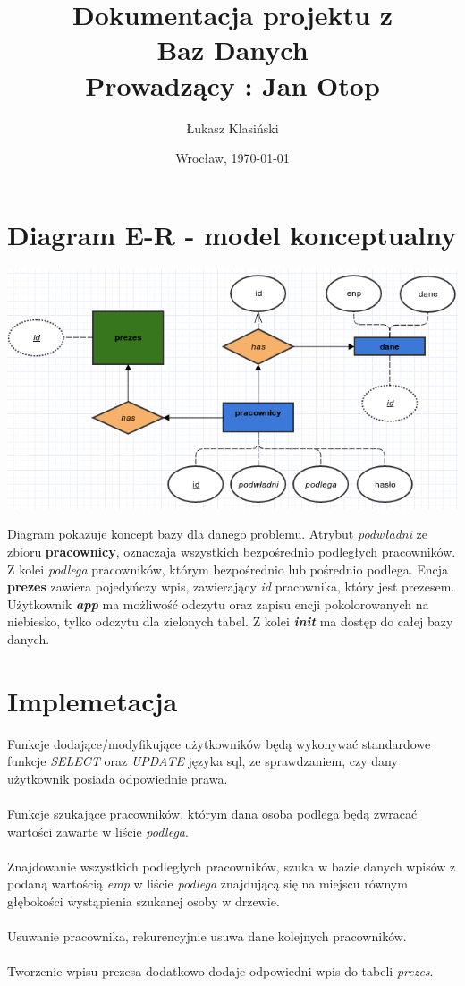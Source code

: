 \documentclass[11pt, wide]{article}
\author{Łukasz Klasiński}
\date{Wrocław, \today}
\title{\LARGE\textbf{Dokumentacja projektu z \\Baz Danych\\}
    Prowadzący : Jan Otop}
\begin{document}
    \maketitle
    \thispagestyle{empty}
    \section{Diagram E-R - model konceptualny}
    \includegraphics[width=\textwidth]{er}    

    Diagram pokazuje koncept bazy dla danego problemu. Atrybut \textit{podwładni}
    ze zbioru \textbf{pracownicy}, oznaczaja wszystkich bezpośrednio podległych pracowników. Z kolei
    \textit{podlega} pracowników, którym bezpośrednio lub pośrednio podlega. 
    Encja \textbf{prezes} zawiera pojedyńczy wpis, zawierający \textit{id} pracownika, który
    jest prezesem.\\

    Użytkownik \textbf{\textit{app}} ma możliwość odczytu oraz zapisu encji pokolorowanych
    na niebiesko, tylko odczytu dla zielonych tabel. Z kolei \textbf{\textit{init}} ma dostęp do całej bazy danych.

    \section{Implemetacja}
    Funkcje dodające/modyfikujące użytkowników będą wykonywać standardowe
    funkcje \textit{SELECT} oraz \textit{UPDATE} języka sql, ze sprawdzaniem, czy 
    dany użytkownik posiada odpowiednie prawa.\\\\       
    Funkcje szukające pracowników, którym dana osoba podlega będą zwracać wartości zawarte w liście \textit{podlega}.\\\\ 
    Znajdowanie wszystkich podległych pracowników, szuka w bazie danych wpisów z podaną wartością \textit{emp} w liście \textit{podlega} 
    znajdującą się na miejscu równym głębokości wystąpienia szukanej osoby w drzewie. \\\\
    Usuwanie pracownika, rekurencyjnie usuwa dane kolejnych pracowników.\\\\
    Tworzenie wpisu prezesa dodatkowo dodaje odpowiedni wpis do tabeli \textit{prezes}.
\end{document}
